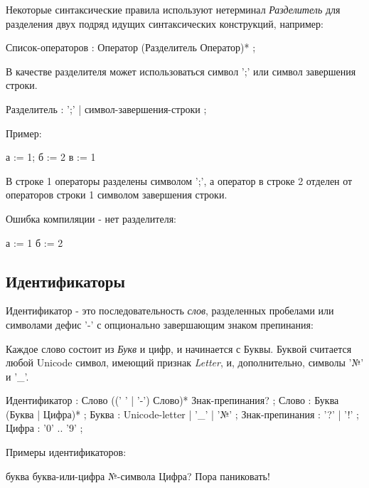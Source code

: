 Некоторые синтаксические правила используют нетерминал \emph{Разделитель} для разделения двух подряд идущих синтаксических конструкций, например:
\begin{Grammar}
Список-операторов
	: Оператор (Разделитель Оператор)* 
	;
\end{Grammar}

В качестве разделителя может использоваться символ ';' или символ завершения строки.
\begin{Grammar}
Разделитель
	: ';'
	| символ-завершения-строки
	;	
\end{Grammar}

Пример:
\begin{Trivil}
а := 1; б := 2
в := 1 
\end{Trivil}

В строке 1 операторы разделены символом ';', а оператор в строке 2 отделен от операторов строки 1 символом завершения строки.

Ошибка компиляции - нет разделителя:
\begin{SampleErr}
а := 1 б := 2
\end{SampleErr}

\hypertarget{idents}{%
\subsection{Идентификаторы}\label{lex:idents}}

Идентификатор - это последовательность \emph{слов}, разделенных пробелами или символами дефис '-' с опционально завершающим знаком препинания:

Каждое слово состоит из \emph{Букв} и цифр, и начинается с Буквы. Буквой считается любой Unicode символ, имеющий признак \emph{Letter}, и, дополнительно, символы '№'
и '\_'. 

\begin{Grammar}
Идентификатор
	: Слово ((' ' | '-') Слово)* Знак-препинания?
	;
Слово
	: Буква (Буква | Цифра)*
	;
Буква
	: Unicode-letter
	| '_'
	| '№'
	;
Знак-препинания
	: '?' 
	| '!' 
	;
Цифра
    : '0' .. '9'
    ;
\end{Grammar}

Примеры идентификаторов:
\begin{Trivil}
буква
буква-или-цифра
№-символа
Цифра?
Пора паниковать!
\end{Trivil}
